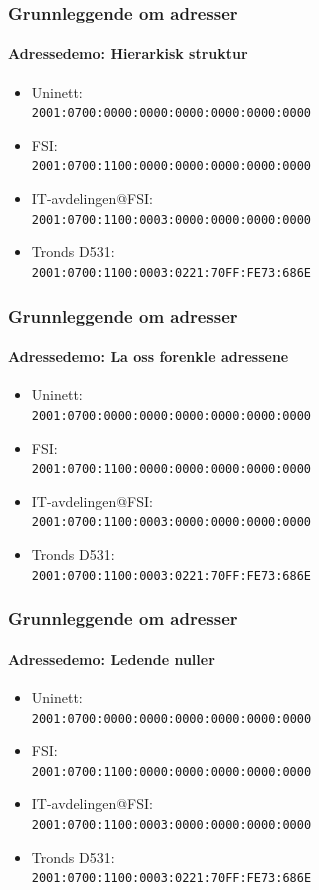 \begin{frame}%
  \frametitle{Grunnleggende om adresser}
  \framesubtitle{Adressedemo: Hierarkisk struktur}
  \begin{itemize}%
  \item Uninett:\\\texttt{\alert{2001:0700}:0000:0000:0000:0000:0000:0000\phantom{/32}}
  \item FSI:\\\texttt{2001:0700:\alert{1100}:0000:0000:0000:0000:0000\phantom{/48}}
  \item IT-avdelingen@FSI:\\\texttt{2001:0700:1100:\alert{0003}:0000:0000:0000:0000\phantom{/64}}
  \item Tronds D531:\\\texttt{2001:0700:1100:0003:\alert{0221:70FF:FE73:686E}\phantom{/128}}
  \end{itemize}
\end{frame}

\begin{frame}%
  \frametitle{Grunnleggende om adresser}
  \framesubtitle{Adressedemo: La oss forenkle adressene}
  \begin{itemize}%
  \item Uninett:\\\texttt{2001:0700:0000:0000:0000:0000:0000:0000\phantom{/32}}
  \item FSI:\\\texttt{2001:0700:1100:0000:0000:0000:0000:0000\phantom{/48}}
  \item IT-avdelingen@FSI:\\\texttt{2001:0700:1100:0003:0000:0000:0000:0000\phantom{/64}}
  \item Tronds D531:\\\texttt{2001:0700:1100:0003:0221:70FF:FE73:686E\phantom{/128}}
  \end{itemize}
\end{frame}

\begin{frame}%
  \frametitle{Grunnleggende om adresser}
  \framesubtitle{Adressedemo: Ledende nuller}
  \begin{itemize}%
  \item Uninett:\\\texttt{2001:\alert{0}700:\alert{000}0:\alert{000}0:\alert{000}0:\alert{000}0:\alert{000}0:\alert{000}0\phantom{/32}}
  \item FSI:\\\texttt{2001:\alert{0}700:1100:\alert{000}0:\alert{000}0:\alert{000}0:\alert{000}0:\alert{000}0\phantom{/48}}
  \item IT-avdelingen@FSI:\\\texttt{2001:\alert{0}700:1100:\alert{000}3:\alert{000}0:\alert{000}0:\alert{000}0:\alert{000}0\phantom{/64}}
  \item Tronds D531:\\\texttt{2001:\alert{0}700:1100:\alert{000}3:\alert{0}221:70FF:FE73:686E\phantom{/128}}
  \end{itemize}
\end{frame}

